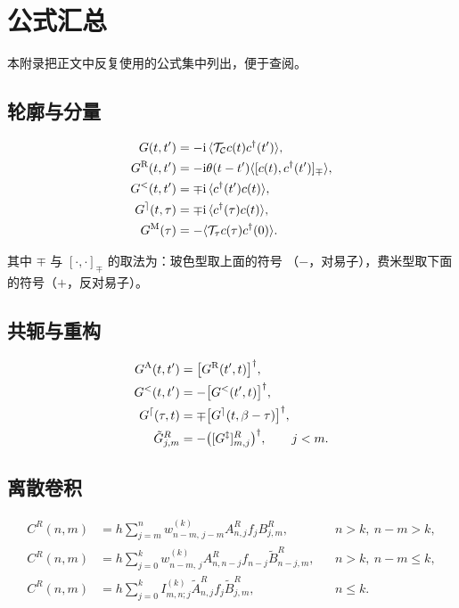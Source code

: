 \chapter{公式汇总}
\label{app:formulas}

本附录把正文中反复使用的公式集中列出，便于查阅。

\section{轮廓与分量}
\begin{align}
    G(t,t') &= -\mathrm{i}\,\langle \mathcal{T}_{\mathcal{C}}
        c(t)c^{\dagger}(t')\rangle,\\
    G^{\mathrm{R}}(t,t') &= -\mathrm{i}\theta(t-t')
        \langle[c(t),c^{\dagger}(t')]_{\mp}\rangle,\\
    G^{<}(t,t') &= \mp\mathrm{i}\,\langle
        c^{\dagger}(t')c(t)\rangle,\\
    G^{\rceil}(t,\tau) &= \mp\mathrm{i}\,\langle
        c^{\dagger}(\tau)c(t)\rangle,\\
    G^{\mathrm{M}}(\tau) &= -\langle
        \mathcal{T}_\tau c(\tau)c^{\dagger}(0)\rangle .
\end{align}

其中 $\mp$ 与 $[\cdot,\cdot]_{\mp}$ 的取法为：玻色型取上面的符号
（$-$，对易子），费米型取下面的符号（$+$，反对易子）。

\section{共轭与重构}
\begin{align}
    G^{\mathrm{A}}(t,t') &= \big[G^{\mathrm{R}}(t',t)\big]^{\dagger},\\
    G^{<}(t,t') &= -\big[G^{<}(t',t)\big]^{\dagger},\\
    G^{\lceil}(\tau,t) &= \mp\big[G^{\rceil}(t,\beta-\tau)\big]^{\dagger},\\
    \tilde{G}^{R}_{j,m} &=
        -\big([G^{\ddagger}]^{R}_{m,j}\big)^{\dagger},
        \qquad j<m .
\end{align}

\section{离散卷积}
\begin{align}
    C^{R}(n,m) &=
        h\sum^{n}_{j=m}w^{(k)}_{n-m,\,j-m}
        A^{R}_{n,j}f_j B^{R}_{j,m},
        && n>k,\ n-m>k,\\
    C^{R}(n,m) &=
        h\sum^{k}_{j=0}w^{(k)}_{n-m,\,j}
        A^{R}_{n,n-j}f_{n-j}\tilde{B}^{R}_{n-j,m},
        && n>k,\ n-m\le k,\\
    C^{R}(n,m) &=
        h\sum^{k}_{j=0}I^{(k)}_{m,n;j}
        \tilde{A}^{R}_{n,j}f_j\tilde{B}^{R}_{j,m},
        && n\le k .
\end{align}

